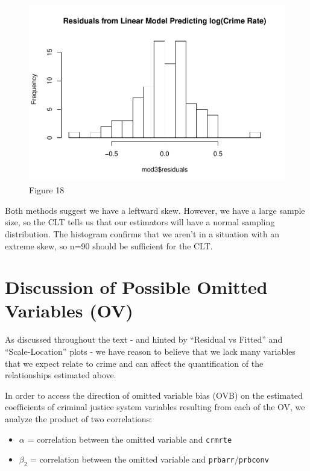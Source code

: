 \documentclass[]{article}
\providecommand{\tightlist}{%
  \setlength{\itemsep}{0pt}\setlength{\parskip}{0pt}}
\begin{document}
\begin{figure}

{\centering \includegraphics{lab_3_v7_files/figure-latex/unnamed-chunk-50-1} 

}

\caption{Figure 18}\label{fig:unnamed-chunk-50}
\end{figure}

Both methods suggest we have a leftward skew. However, we have a large
sample size, so the CLT tells us that our estimators will have a normal
sampling distribution. The histogram confirms that we aren't in a
situation with an extreme skew, so n=90 should be sufficient for the
CLT.

\hypertarget{discussion-of-possible-omitted-variables-ov}{%
\section{Discussion of Possible Omitted Variables
(OV)}\label{discussion-of-possible-omitted-variables-ov}}

As discussed throughout the text - and hinted by ``Residual vs Fitted''
and ``Scale-Location'' plots - we have reason to believe that we lack
many variables that we expect relate to crime and can affect the
quantification of the relationships estimated above.

In order to access the direction of omitted variable bias (OVB) on the
estimated coefficients of criminal justice system variables resulting
from each of the OV, we analyze the product of two correlations:

\begin{itemize}
\tightlist
\item
  \(\alpha\) = correlation between the omitted variable and
  \texttt{crmrte}
\item
  \(\beta_2\) = correlation between the omitted variable and
  \texttt{prbarr}/\texttt{prbconv}
\end{itemize}
\end{document}
